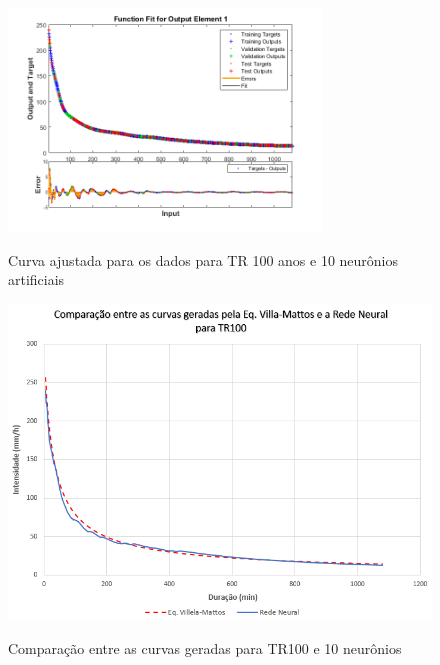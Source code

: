 \begin{figure}[H]
    \caption{Curva ajustada para os dados para TR 100 anos e 10 neurônios artificiais}
    \centering
    \includegraphics[width=0.74\textwidth]{Textuais/Figuras/NN/tr100-10neuronio.png}
    \label{fig:tr100-10n}
\end{figure}

\begin{figure}[H]
    \caption{Comparação entre as curvas geradas para TR100 e 10 neurônios}
    \centering
    \includegraphics[width=\textwidth]{Textuais/Resultados/Comparacao/TR100.png}
    \label{fig:comp-tr100}
\end{figure}